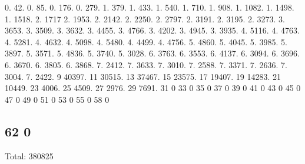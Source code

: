 0. 42. 0. 85. 0. 176. 0. 279. 1. 379. 1. 433. 1. 540. 1. 710. 1. 908. 1. 1082. 1. 1498. 1. 1518. 2. 1717 2. 1953. 2. 2142. 2. 2250. 2. 2797. 2. 3191. 2. 3195. 2. 3273. 3. 3653. 3. 3509. 3. 3632. 3. 4455. 3. 4766. 3. 4202. 3. 4945. 3. 3935. 4. 5116. 4. 4763. 4. 5281. 4. 4632. 4. 5098. 4. 5480. 4. 4499. 4. 4756. 5. 4860. 5. 4045. 5. 3985. 5. 3897. 5. 3571. 5. 4836. 5. 3740. 5. 3028. 6. 3763. 6. 3553. 6. 4137. 6. 3094. 6. 3696. 6. 3670. 6. 3805. 6. 3868. 7. 2412. 7. 3633. 7. 3010. 7. 2588. 7. 3371. 7. 2636. 7. 3004. 7. 2422. 9 40397. 11 30515. 13 37467. 15 23575. 17 19407. 19 14283. 21 10449. 23 4006. 25 4509. 27 2976. 29 7691. 31 0 33 0 35 0 37 0 39 0 41 0 43 0 45 0 47 0 49 0 51 0 53 0 55 0 58 0 \subsection*{62 0 }

Total\+: 380825 